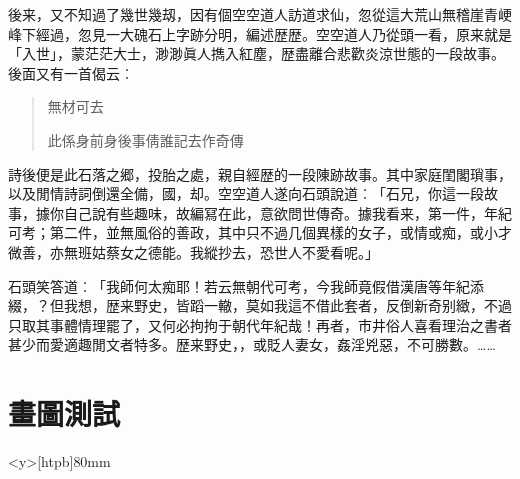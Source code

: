 {\par%
後来，又不知過了幾世幾刼，因有個空空道人訪道求仙，忽從這大荒山無稽崖青峺峰下經過，忽見一大磈石上字跡分明，編述歴歴。空空道人乃從頭一看，原来就是「入世」，蒙茫茫大士，渺渺眞人擕入紅塵，歴盡離合悲歡炎涼世態的一段故事。後面又有一首偈云︰
\begin{quotation}
\par%
無材可去%
\hspace{2zw}
\par%
此係身前身後事\hspace{2zw}倩誰記去作奇傳
\end{quotation}
\par%
詩後便是此石落之郷，投胎之處，親自經歴的一段陳跡故事。其中家庭閨閣瑣事，以及閒情詩詞倒還全備，國，却。空空道人遂向石頭說道︰「石兄，你這一段故事，據你自己說有些趣味，故編冩在此，意欲問世傳奇。據我看来，第一件，年紀可考；第二件，並無風俗的善政，其中只不過几個異樣的女子，或情或痴，或小才微善，亦無班姑蔡女之德能。我縱抄去，恐世人不愛看呢。」

\par%
石頭笑答道︰「我師何太痴耶！若云無朝代可考，今我師竟假借漢唐等年紀添綴，？但我想，歴来野史，皆蹈一轍，莫如我這不借此套者，反倒新奇别緻，不過只取其事體情理罷了，又何必拘拘于朝代年紀哉！再者，市井俗人喜看理治之書者甚少而愛適趣閒文者特多。歴来野史，，或貶人妻女，姦淫兇惡，不可勝數。……




\chapter{畫圖測試}


\begin{minipage}<y>[htpb]{80mm}
	\begin{center}
	\end{center}
\end{minipage}


}
